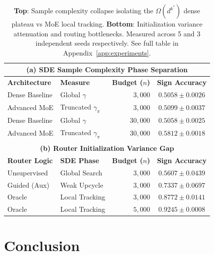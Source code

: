 \documentclass{article}
\newcommand{\1}{\mathbb{I}}
\begin{document}
\begin{table}[h]
    \centering
    \caption{\textbf{Top}: Sample complexity collapse isolating the $\Omega(d^{k^*})$ dense plateau vs MoE local tracking. \textbf{Bottom}: Initialization variance attenuation and routing bottlenecks. Measured across 5 and 3 independent seeds respectively. See full table in Appendix~\ref{app:experiments}.}
    \label{tab:main_empirical}
    \vspace{0.5em}
    \begin{tabular}{l l r c}
        \toprule
        \multicolumn{4}{c}{\textbf{(a) SDE Sample Complexity Phase Separation}} \\
        \midrule
        \textbf{Architecture} & \textbf{Measure} & \textbf{Budget ($n$)} & \textbf{Sign Accuracy} \\
        \midrule
        Dense Baseline & Global $\gamma$ & $3,000$ & $0.5058 \pm 0.0026$ \\
        Advanced MoE & Truncated $\gamma_\pi$ & $3,000$ & $0.5099 \pm 0.0037$ \\
        Dense Baseline & Global $\gamma$ & $30,000$ & $0.5058 \pm 0.0025$ \\
        Advanced MoE & Truncated $\gamma_\pi$ & $30,000$ & $\mathbf{0.5812 \pm 0.0018}$ \\
        \midrule
        \\
        \midrule
        \multicolumn{4}{c}{\textbf{(b) Router Initialization Variance Gap}} \\
        \midrule
        \textbf{Router Logic} & \textbf{SDE Phase} & \textbf{Budget ($n$)} & \textbf{Sign Accuracy} \\
        \midrule
        Unsupervised & Global Search & $3,000$ & $0.5607 \pm 0.0439$ \\
        Guided (Aux) & Weak Upcycle & $3,000$ & $0.7337 \pm 0.0697$ \\
        Oracle & Local Tracking & $3,000$ & $\mathbf{0.8772 \pm 0.0141}$ \\
        Oracle & Local Tracking & $5,000$ & $\mathbf{0.9245 \pm 0.0008}$ \\
        \bottomrule
    \end{tabular}
\end{table}


\section{Conclusion}
\end{document}
